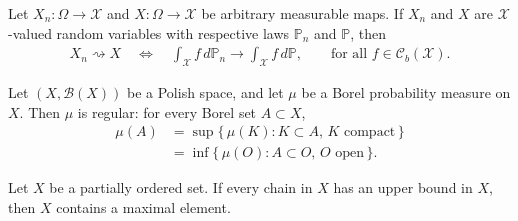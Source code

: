 \documentclass[twoside,11pt,a4paper]{article}
\begin{document}
\begin{definition}\label{cv}
Let $X_n : \Omega \to \mathcal{X}$ and $X : \Omega \to \mathcal{X}$ be arbitrary measurable maps. If $X_n$ and $X$ are $\mathcal{X}$-valued random variables with respective laws 
$\mathbb{P}_n$ and $\mathbb{P}$, then
\begin{align*}
X_n \rightsquigarrow X
\quad \Longleftrightarrow \quad
\int_{\mathcal{X}} f\, d\mathbb{P}_n 
\longrightarrow 
\int_{\mathcal{X}} f\, d\mathbb{P},
\qquad \text{for all } f \in \mathcal{C}_b(\mathcal{X}).
\end{align*}
\end{definition}


\begin{lemma}
Let $(X, \mathcal{B}(X))$ be a Polish space, and let $\mu$ be a Borel probability measure on $X$. Then $\mu$ is regular: for every Borel set $A \subset X$,
\begin{align*}
\mu(A) 
&= \sup \{\, \mu(K) : K \subset A,\, K \text{ compact} \,\}
\\
&= \inf \{\, \mu(O) : A \subset O,\, O \text{ open} \,\}.
\end{align*}
\end{lemma}


\begin{lemma}\label{Zorn}
Let \(X\) be a partially ordered set. If every chain in \(X\) has an upper
bound in \(X\), then \(X\) contains a maximal element.
\end{lemma}
\end{document}
